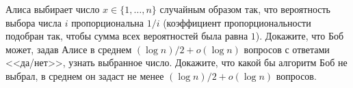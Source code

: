 Алиса выбирает число $x \in \{1, \dots, n\}$ случайным образом так, что вероятность выбора числа $i$
пропорциональна $1 / i$ (коэффициент пропорциональности подобран так, чтобы сумма всех вероятностей
была равна $1$). Докажите, что Боб может, задав Алисе в среднем $(\log n) / 2 + o(\log n)$ вопросов с
ответами <<да/нет>>, узнать выбранное число. Докажите, что какой бы алгоритм Боб не выбрал, в среднем он
задаст не менее $(\log n) / 2 + o(\log n)$ вопросов.